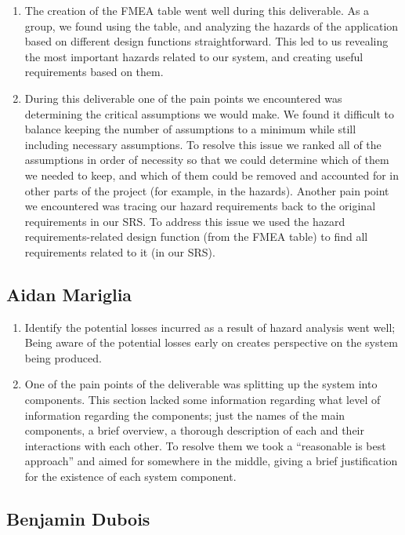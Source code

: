 \documentclass{article}
\begin{document}
\begin{enumerate}
    \item The creation of the FMEA table went well during this deliverable. As a group, we found using the table, and analyzing the hazards of the application based on different design functions straightforward. This led to us revealing the most important hazards related to our system, and creating useful requirements based on them.
    \item During this deliverable one of the pain points we encountered was determining the critical assumptions we would make. We found it difficult to balance keeping the number of assumptions to a minimum while still including necessary assumptions. To resolve this issue we ranked all of the assumptions in order of necessity so that we could determine which of them we needed to keep, and which of them could be removed and accounted for in other parts of the project (for example, in the hazards). Another pain point we encountered was tracing our hazard requirements back to the original requirements in our SRS. To address this issue we used the hazard requirements-related design function (from the FMEA table) to find all requirements related to it (in our SRS).
\end{enumerate}  

\subsection*{Aidan Mariglia}

\begin{enumerate}
    \item Identify the potential losses incurred as a result of hazard analysis went well; Being aware of the potential losses early on creates perspective on the system being produced.
    \item One of the pain points of the deliverable was splitting up the system into components. This section lacked some information regarding what level of information regarding the components; just the names of the main components, a brief overview, a thorough description of each and their interactions with each other. To resolve them we took a “reasonable is best approach” and aimed for somewhere in the middle, giving a brief justification for the existence of each system component. 

\end{enumerate}  

\subsection*{Benjamin Dubois}
\end{document}
